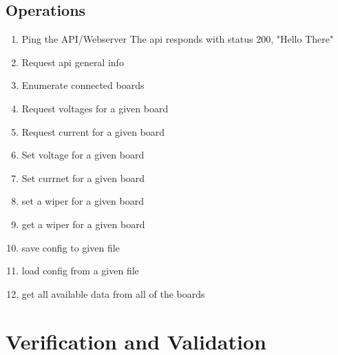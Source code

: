 \documentclass[11pt,letterpaper]{article}
\begin{document}
\subsection{Operations}
\begin{enumerate}
    \item Ping the API/Webserver
        The api responds with status 200, "Hello There"
    \item Request api general info
    \item Enumerate connected boards
    \item Request voltages for a given board
    \item Request current for a given board
    \item Set voltage for a given board
    \item Set currnet for a given board
    \item set a wiper for a given board
    \item get a wiper for a given board
    \item save config to given file
    \item load config from a given file
    \item get all available data from all of the boards
\end{enumerate}

\newpage
\section{Verification and Validation}
\end{document}
